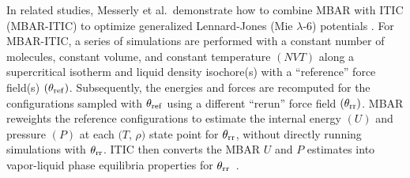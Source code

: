 \documentclass[journal=jced,manuscript=article]{achemso}
\begin{document}

In related studies, Messerly et al.~demonstrate how to combine MBAR with ITIC (MBAR-ITIC) to optimize generalized Lennard-Jones (Mie $\lambda$-6) potentials \cite{Postdoc_1,Postdoc_2}. For MBAR-ITIC, a series of simulations are performed with a constant number of molecules, constant volume, and constant temperature $(NVT)$ along a supercritical isotherm and liquid density isochore(s) with a ``reference'' force field(s) $(\theta_{\rm ref})$. Subsequently, the energies and forces are recomputed for the configurations sampled with $\theta_{\rm ref}$ using a different ``rerun'' force field $(\theta_{\rm rr})$. MBAR reweights the reference configurations to estimate the internal energy $(U)$ and pressure $(P)$ at each $(T$, $\rho)$ state point for $\theta_{\rm rr}$, without directly running simulations with $\theta_{\rm rr}$. ITIC then converts the MBAR $U$ and $P$ estimates into vapor-liquid phase equilibria properties for $\theta_{\rm rr}$~\cite{Mostafa_Diss,Mostafa2018}.
\end{document}
